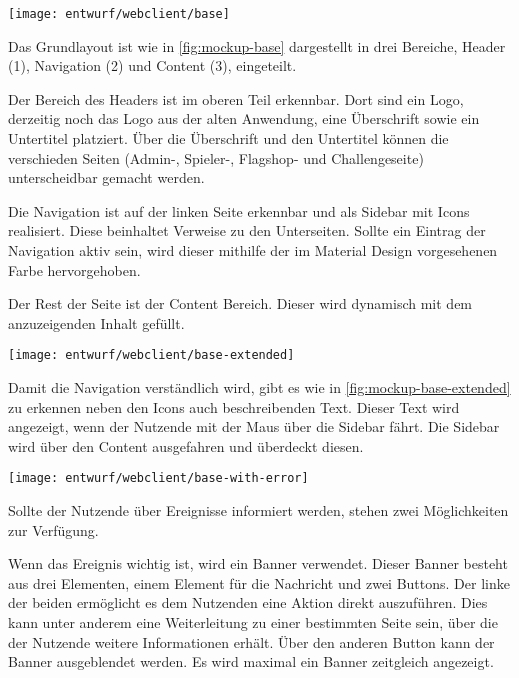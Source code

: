 \begin{center}
	\texttt{[image: entwurf/webclient/base]}
	\label{fig:mockup-base}
\end{center}

Das Grundlayout ist wie in \autoref{fig:mockup-base} dargestellt in drei Bereiche, Header (1), Navigation (2) und Content (3), eingeteilt. 

Der Bereich des Headers ist im oberen Teil erkennbar. Dort sind ein Logo, derzeitig noch das Logo aus der alten Anwendung, eine Überschrift sowie ein Untertitel platziert. Über die Überschrift und den Untertitel können die verschieden Seiten (Admin-, Spieler-, Flagshop- und Challengeseite) unterscheidbar gemacht werden.

Die Navigation ist auf der linken Seite erkennbar und als Sidebar mit Icons realisiert. Diese beinhaltet Verweise zu den Unterseiten. Sollte ein Eintrag der Navigation aktiv sein, wird dieser mithilfe der im Material Design vorgesehenen Farbe hervorgehoben.

Der Rest der Seite ist der Content Bereich. Dieser wird dynamisch mit dem anzuzeigenden Inhalt gefüllt.

\begin{center}
	\texttt{[image: entwurf/webclient/base-extended]}
	\label{fig:mockup-base-extended}
\end{center}

Damit die Navigation verständlich wird, gibt es wie in \autoref{fig:mockup-base-extended} zu erkennen neben den Icons auch beschreibenden Text. Dieser Text wird angezeigt, wenn der Nutzende mit der Maus über die Sidebar fährt. Die Sidebar wird über den Content ausgefahren und überdeckt diesen.

\begin{center}
	\texttt{[image: entwurf/webclient/base-with-error]}
	\label{fig:mockup-base-with-error}
\end{center}

Sollte der Nutzende über Ereignisse informiert werden, stehen zwei Möglichkeiten zur Verfügung.

Wenn das Ereignis wichtig ist, wird ein Banner verwendet. Dieser Banner besteht aus drei Elementen, einem Element für die Nachricht und zwei Buttons. Der linke der beiden ermöglicht es dem Nutzenden eine Aktion direkt auszuführen. Dies kann unter anderem eine Weiterleitung zu einer bestimmten Seite sein, über die der Nutzende weitere Informationen erhält. Über den anderen Button kann der Banner ausgeblendet werden. Es wird maximal ein Banner zeitgleich angezeigt.


